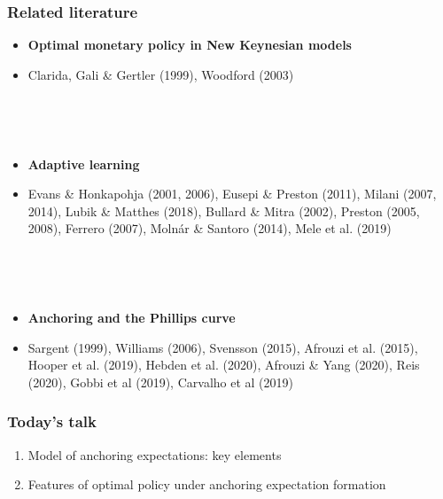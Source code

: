 \documentclass[10pt]{beamer}
\begin{document}
\begin{frame}
	\frametitle{Related literature}

\begin{itemize}
\item \textbf{Optimal monetary policy in New Keynesian models}
\item[] Clarida, Gali \& Gertler (1999), Woodford (2003)

\

\

\item \textbf{Adaptive learning}
\item[] Evans \& Honkapohja (2001, 2006), Eusepi \& Preston (2011), Milani (2007, 2014), Lubik \& Matthes (2018), Bullard \& Mitra (2002), Preston (2005, 2008), Ferrero (2007), Moln\'ar \& Santoro (2014),  Mele et al. (2019)

\

\

\item \textbf{Anchoring and the Phillips curve} 
\item[] Sargent (1999), Williams (2006), Svensson (2015), Afrouzi et al. (2015), Hooper et al. (2019), Hebden et al. (2020), Afrouzi \& Yang (2020), Reis (2020), Gobbi et al (2019), Carvalho et al (2019)
\end{itemize}



\end{frame}

\begin{frame}
	\frametitle{Today's talk}

\vspace{0.2cm}

\begin{enumerate}
\item \hspace{-0.15cm} Model of anchoring expectations: key elements

\vspace{1.2cm}

\item \hspace{-0.15cm} Features of optimal policy under anchoring expectation formation

\end{enumerate}



\end{frame}
\end{document}
